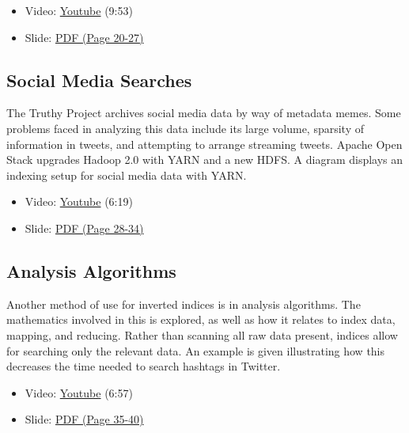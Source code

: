 \begin{itemize}

\item
  Video: \href{https://www.youtube.com/watch?v=eKQaLkw-HBU}{Youtube}
  (9:53)
\item
  Slide:
  \href{https://drive.google.com/open?id=0B88HKpainTSfWUh6dVNHcXloSnc}{PDF
  (Page 20-27)}
\end{itemize}

\subsection{Social Media Searches}\label{social-media-searches}

The Truthy Project archives social media data by way of metadata memes.
Some problems faced in analyzing this data include its large volume,
sparsity of information in tweets, and attempting to arrange streaming
tweets. Apache Open Stack upgrades Hadoop 2.0 with YARN and a new HDFS.
A diagram displays an indexing setup for social media data with YARN.

\begin{itemize}

\item
  Video: \href{https://www.youtube.com/watch?v=a3tcL-Qw9to}{Youtube}
  (6:19)
\item
  Slide:
  \href{https://drive.google.com/open?id=0B88HKpainTSfWUh6dVNHcXloSnc}{PDF
  (Page 28-34)}
\end{itemize}

\subsection{Analysis Algorithms}\label{analysis-algorithms}

Another method of use for inverted indices is in analysis algorithms.
The mathematics involved in this is explored, as well as how it relates
to index data, mapping, and reducing. Rather than scanning all raw data
present, indices allow for searching only the relevant data. An example
is given illustrating how this decreases the time needed to search
hashtags in Twitter.

\begin{itemize}

\item
  Video: \href{https://www.youtube.com/watch?v=MxoMd4mdshE}{Youtube}
  (6:57)
\item
  Slide:
  \href{https://drive.google.com/open?id=0B88HKpainTSfWUh6dVNHcXloSnc}{PDF
  (Page 35-40)}
\end{itemize}
